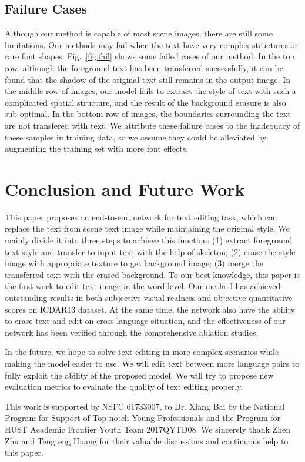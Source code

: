 \documentclass[sigconf]{acmart}
\begin{document}
\subsection{Failure Cases}
Although our method is capable of most scene images, there are still some limitations. Our methods may fail when the text have very complex structures or rare font shapes. Fig.~\ref{fig:fail} shows some failed cases of our method. In the top row, although the foreground text has been transferred successfully, it can be found that the shadow of the original text still remains in the output image. In the middle row of images, our model fails to extract the style of text with such a complicated spatial structure, and the result of the background erasure is also sub-optimal. In the bottom row of images, the boundaries surrounding the text are not transfered with text. We attribute these failure cases to the inadequacy of these samples in training data, so we assume they could be alleviated by augmenting the training set with more font effects. 



\section{Conclusion and Future Work}
This paper proposes an end-to-end network for text editing task, which can replace the text from scene text image while maintaining the original style. We mainly divide it into three steps to achieve this function: (1) extract foreground text style and transfer to input text with the help of skeleton; (2) erase the style image with appropriate texture to get background image; (3) merge the transferred text with the erased background.
To our best knowledge, this paper is the first work to edit text image in the word-level. Our method has achieved outstanding results in both subjective visual realness and objective quantitative scores on ICDAR13 dataset. At the same time, the network also have the ability to erase text and edit on cross-language situation, and the effectiveness of our network has been verified through the comprehensive ablation studies.

In the future, we hope to solve text editing in more complex scenarios while making the model easier to use. We will edit text between more language pairs to fully exploit the ability of the proposed model. We will try to propose new evaluation metrics to evaluate the quality of text editing properly. 



\begin{acks}
This work is supported by NSFC 61733007, to Dr. Xiang Bai by the National Program for Support of Top-notch Young Professionals and the Program for HUST Academic Frontier Youth Team 2017QYTD08. We sincerely thank Zhen Zhu and Tengteng Huang for their valuable discussions and continuous help to this paper.
\end{acks}



\end{document}
